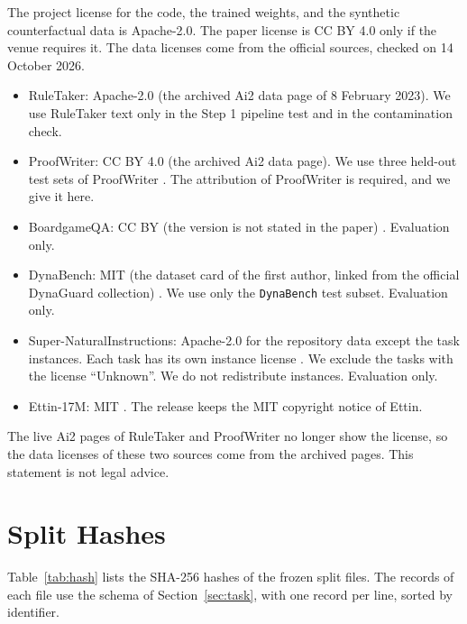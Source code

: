 \documentclass[11pt,a4paper]{article}
\begin{document}
The project license for the code, the trained weights, and the synthetic counterfactual data is Apache-2.0.
The paper license is CC BY 4.0 only if the venue requires it.
The data licenses come from the official sources, checked on 14 October 2026.
\begin{itemize}
  \item RuleTaker: Apache-2.0 (the archived Ai2 data page of 8 February 2023). We use RuleTaker text only in the Step 1 pipeline test and in the contamination check.
  \item ProofWriter: CC BY 4.0 (the archived Ai2 data page). We use three held-out test sets of ProofWriter \cite{tafjord2021}. The attribution of ProofWriter is required, and we give it here.
  \item BoardgameQA: CC BY (the version is not stated in the paper) \cite{kazemi2023}. Evaluation only.
  \item DynaBench: MIT (the dataset card of the first author, linked from the official DynaGuard collection) \cite{hoover2025}. We use only the \texttt{DynaBench} test subset. Evaluation only.
  \item Super-NaturalInstructions: Apache-2.0 for the repository data except the task instances. Each task has its own instance license \cite{wang2022}. We exclude the tasks with the license ``Unknown''. We do not redistribute instances. Evaluation only.
  \item Ettin-17M: MIT \cite{weller2026}. The release keeps the MIT copyright notice of Ettin.
\end{itemize}
The live Ai2 pages of RuleTaker and ProofWriter no longer show the license, so the data licenses of these two sources come from the archived pages.
This statement is not legal advice.




\appendix

\section{Split Hashes}\label{app:hash}

Table~\ref{tab:hash} lists the SHA-256 hashes of the frozen split files.
The records of each file use the schema of Section~\ref{sec:task}, with one record per line, sorted by identifier.
\end{document}
